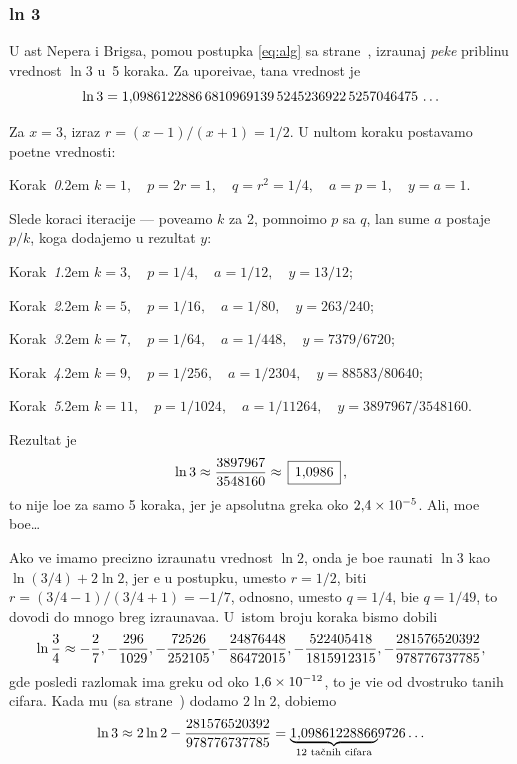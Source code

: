 \subsubsection{ln 3}\label{sssec:ln3}
 
\zadatak
U {\cv}ast Nepera i Brigsa,
pomo{\cc}u postupka \eqref{eq:alg} sa 
strane~\pageref{eq:alg},
izra{\cv}unaj {\sl pe{\sv}ke\/} pribli{\zv}nu vrednost $\ln 3$
u~5 koraka. Za upore{\dj}iva{\nj}e, ta{\cv}na vrednost je
$$
\ln3=1\.
0986122886\,
6810969139\,
5245236922\,
5257046475\,\ldots
$$

\def\step#1{\par\indent\leavevmode
  Korak~{\it#1}.\kern2em\relax}

\resenje
Za $x=3$, izraz $r=(x-1)/(x+1)=1/2$. U nultom koraku postav{\lj}amo po{\cv}etne vrednosti:

\smallskip

\step0 $k=1,\quad p=2r=1,\quad q=r^2=1/4,\quad a=p=1,\quad y=a=1$.

\smallskip

\noindent Slede koraci iteracije --- pove{\cc}amo $k$ za 2, pomno{\zv}imo $p$ sa $q$,
{\cv}lan sume $a$ postaje $p/k$, koga dodajemo u rezultat $y$:

\smallskip

\step1 $k=3,\quad p=1/4,\quad a=1/12,\quad y=13/12$;
\step2 $k=5,\quad p=1/16,\quad a=1/80,\quad y=263/240$;
\step3 $k=7,\quad p=1/64,\quad a=1/448,\quad y=7379/6720$;
\step4 $k=9,\quad p=1/256,\quad a=1/2304,\quad y=88583/80640$;
\step5 $k=11,\quad p=1/1024,\quad a=1/11264,\quad y=3897967/3548160$.

\smallskip

\noindent Rezultat je
$$
\ln3\approx\frac{3897967}{3548160}\approx \ram{1\.0986},
$$
{\sv}to nije lo{\sv}e za samo 5 koraka, jer je apsolutna gre{\sv}ka oko $2\.4\puta10^{-5}$.
Ali, mo{\zv}e bo{\lj}e\dots

\dodatak
Ako ve{\cc} imamo precizno izra{\cv}unatu vrednost $\ln2$, onda je bo{\lj}e ra{\cv}unati $\ln3$ kao $\ln(3/4)+2\ln2$,
jer {\cc}e u postupku, umesto $r=1/2$, biti $r=(3/4-1)/(3/4+1)=-1/7$, 
odnosno, umesto $q=1/4$, bi{\cc}e $q=1/49$,
{\sv}to dovodi do mnogo br{\zv}eg izra{\cv}unava{\nj}a. U~istom broju koraka bismo dobili
$$
\ln\frac34\approx
-\ff2/7, -\ff296/1029, -\ff72526/252105, -\ff24876448/86472015, 
-\ff522405418/1815912315, -\ff281576520392/978776737785,
$$
gde posled{\nj}i razlomak ima gre{\sv}ku od oko $1\.6\puta10^{-12}$,
{\sv}to je vi{\sv}e od dvostruko ta{\cv}nih cifara.
Kada mu (sa strane~\pageref{ln2}) dodamo $2\ln2$, dobi{\cc}emo
$$\ln3\approx 2\ln2 -\frac{281576520392}{978776737785} =
\underbrace{1\.09861228866}_{\hbox{\scriptsize 12 ta{\cv}nih cifara}}\!9726\ldots$$

